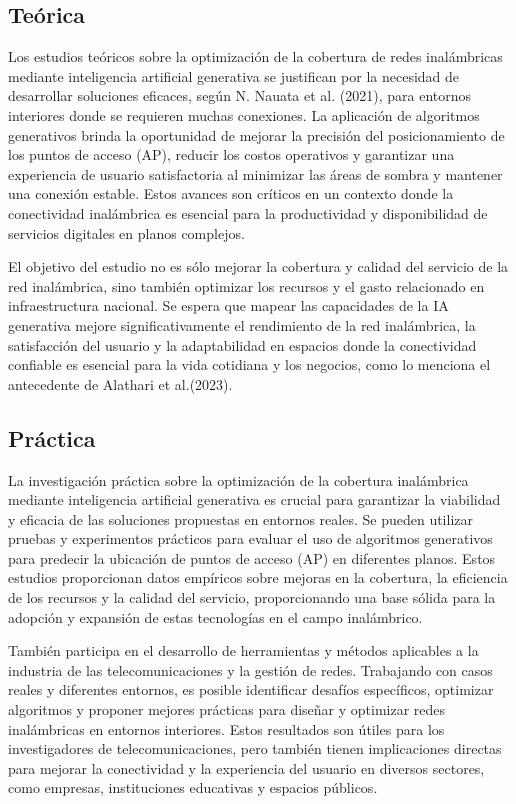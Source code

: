 \subsection{Teórica}
Los estudios teóricos sobre la optimización de la cobertura de redes inalámbricas mediante inteligencia artificial generativa se justifican por la necesidad de desarrollar soluciones eficaces, según N. Nauata et al. (2021), para entornos interiores donde se requieren muchas conexiones. La aplicación de algoritmos generativos brinda la oportunidad de mejorar la precisión del posicionamiento de los puntos de acceso (AP), reducir los costos operativos y garantizar una experiencia de usuario satisfactoria al minimizar las áreas de sombra y mantener una conexión estable. Estos avances son críticos en un contexto donde la conectividad inalámbrica es esencial para la productividad y disponibilidad de servicios digitales en planos complejos. 

El objetivo del estudio no es sólo mejorar la cobertura y calidad del servicio de la red inalámbrica, sino también optimizar los recursos y el gasto relacionado en infraestructura nacional. Se espera que mapear las capacidades de la IA generativa mejore significativamente el rendimiento de la red inalámbrica, la satisfacción del usuario y la adaptabilidad en espacios donde la conectividad confiable es esencial para la vida cotidiana y los negocios, como lo menciona el antecedente de Alathari et al.(2023).

\subsection{Práctica}
La investigación práctica sobre la optimización de la cobertura inalámbrica mediante inteligencia artificial generativa es crucial para garantizar la viabilidad y eficacia de las soluciones propuestas en entornos reales. Se pueden utilizar pruebas y experimentos prácticos para evaluar el uso de algoritmos generativos para predecir la ubicación de puntos de acceso (AP) en diferentes planos. Estos estudios proporcionan datos empíricos sobre mejoras en la cobertura, la eficiencia de los recursos y la calidad del servicio, proporcionando una base sólida para la adopción y expansión de estas tecnologías en el campo inalámbrico.

También participa en el desarrollo de herramientas y métodos aplicables a la industria de las telecomunicaciones y la gestión de redes. Trabajando con casos reales y diferentes entornos, es posible identificar desafíos específicos, optimizar algoritmos y proponer mejores prácticas para diseñar y optimizar redes inalámbricas en entornos interiores. Estos resultados son útiles para los investigadores de telecomunicaciones, pero también tienen implicaciones directas para mejorar la conectividad y la experiencia del usuario en diversos sectores, como empresas, instituciones educativas y espacios públicos.


